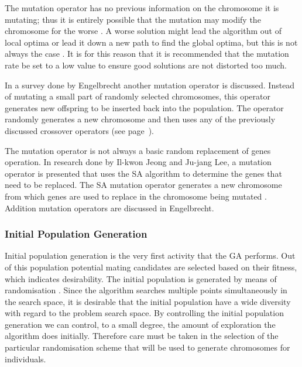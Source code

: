 The mutation operator has no previous information on the chromosome it is mutating; thus it is entirely possible that the mutation may modify the chromosome for the worse \cite{AcceleratingGA}. A worse solution might lead the algorithm out of local optima or lead it down a new path to find the global optima, but this is not always the case \cite{AdaptiveSAGA,FamilyGA,ConstrainedGA}. It is for this reason that it is recommended that the mutation rate be set to a low value to ensure good solutions are not distorted too much\cite{CompuIntelligenceIntro}.

In a survey done by Engelbrecht\cite{CompuIntelligenceIntro} another mutation operator is discussed. Instead of mutating a small part of randomly selected chromosomes, this operator generates new offspring to be inserted back into the population. The operator randomly generates a new chromosome and then uses any of the previously discussed crossover operators (see page~\pageref{sec:crossover}).

The mutation operator is not always a basic random replacement of genes operation. In research done by Il-kwon Jeong and Ju-jang Lee\cite{AdaptiveSAGA}, a mutation operator is presented that uses the \gls{SA} algorithm to determine the genes that need to be replaced. The \gls{SA} mutation operator generates a new chromosome from which genes are used to replace in the chromosome being mutated \cite{AdaptiveSAGA}. Addition mutation operators are discussed in Engelbrecht\cite{CompuIntelligenceIntro}.
\subsubsection{Initial Population Generation}
Initial population generation is the very first activity that the \gls{GA} performs. Out of this population potential mating candidates are selected based on their fitness, which indicates desirability. The initial population is generated by means of randomisation \cite{SelfAdaptiveGA}. Since the algorithm searches multiple points simultaneously in the search space, it is desirable that the initial population have a wide diversity with regard to the problem search space\cite{CombinedBranchBoundGA,DistributedHierarchicalGA}. By controlling the initial population generation we can control, to a small degree, the amount of exploration the algorithm does initially\cite{CombinedBranchBoundGA}. Therefore care must be taken in the selection of the particular randomisation scheme that will be used to generate chromosomes for individuals.

